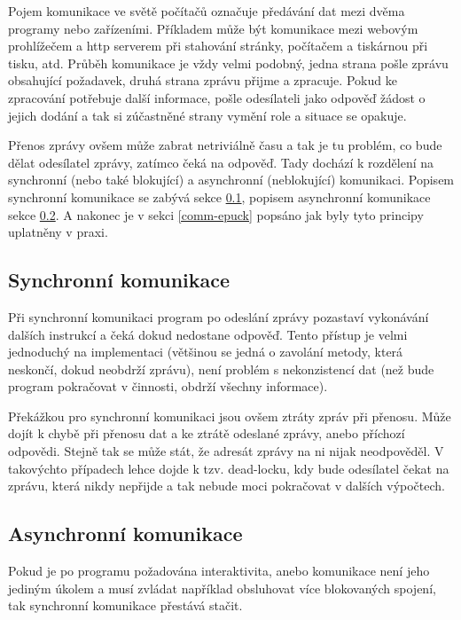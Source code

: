 \documentclass[12pt,notitlepage]{report}
\begin{document}
    Pojem komunikace ve světě počítačů označuje předávání dat mezi dvěma
    programy nebo zařízeními. Příkladem může být komunikace mezi webovým
    prohlížečem a http serverem při stahování stránky, počítačem a tiskárnou
    při tisku, atd. Průběh komunikace je vždy velmi podobný, jedna strana pošle
    zprávu obsahující požadavek, druhá strana zprávu přijme a zpracuje. Pokud
    ke zpracování potřebuje další informace, pošle odesílateli jako odpověď
    žádost o jejich dodání a tak si zúčastněné strany vymění role a situace se
    opakuje.

    Přenos zprávy ovšem může zabrat netriviálně času a tak je tu problém, co
    bude dělat odesílatel zprávy, zatímco čeká na odpověď. Tady dochází k
    rozdělení na synchronní (nebo také blokující) a asynchronní (neblokující)
    komunikaci. Popisem synchronní komunikace se zabývá sekce \ref{sync},
    popisem asynchronní komunikace sekce \ref{async}. A nakonec je v sekci
    \ref{comm-epuck} popsáno jak byly tyto principy uplatněny v praxi.

    \subsection{Synchronní komunikace}
    \label{sync}

    Při synchronní komunikaci program po odeslání zprávy pozastaví vykonávání
    dalších instrukcí a čeká dokud nedostane odpověď. Tento přístup je velmi
    jednoduchý na implementaci (většinou se jedná o zavolání metody, která
    neskončí, dokud neobdrží zprávu), není problém s nekonzistencí dat (než
    bude program pokračovat v činnosti, obdrží všechny informace).

    Překážkou pro synchronní komunikaci jsou ovšem ztráty zpráv při přenosu.
    Může dojít k chybě při přenosu dat a ke ztrátě odeslané zprávy, anebo
    příchozí odpovědi. Stejně tak se může stát, že adresát zprávy na ni nijak
    neodpověděl. V takovýchto případech lehce dojde k tzv. dead-locku, kdy bude
    odesílatel čekat na zprávu, která nikdy nepřijde a tak nebude moci
    pokračovat v dalších výpočtech.

    \subsection{Asynchronní komunikace}
    \label{async}

    Pokud je po programu požadována interaktivita, anebo komunikace není jeho
    jediným úkolem a musí zvládat například obsluhovat více blokovaných
    spojení, tak synchronní komunikace přestává stačit.
\end{document}
